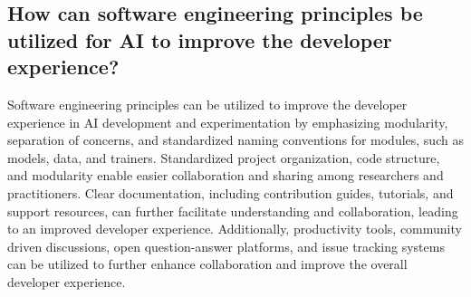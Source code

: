 \subsection{
How can software engineering principles be utilized for AI to improve the developer experience?
}

Software engineering principles can be utilized to improve the developer experience in AI development and experimentation by emphasizing modularity, separation of concerns, and standardized naming conventions for modules, such as models, data, and trainers. Standardized project organization, code structure, and modularity enable easier collaboration and sharing among researchers and practitioners. Clear documentation, including contribution guides, tutorials, and support resources, can further facilitate understanding and collaboration, leading to an improved developer experience. Additionally, productivity tools, community driven discussions, open question-answer platforms, and issue tracking systems can be utilized to further enhance collaboration and improve the overall developer experience.




